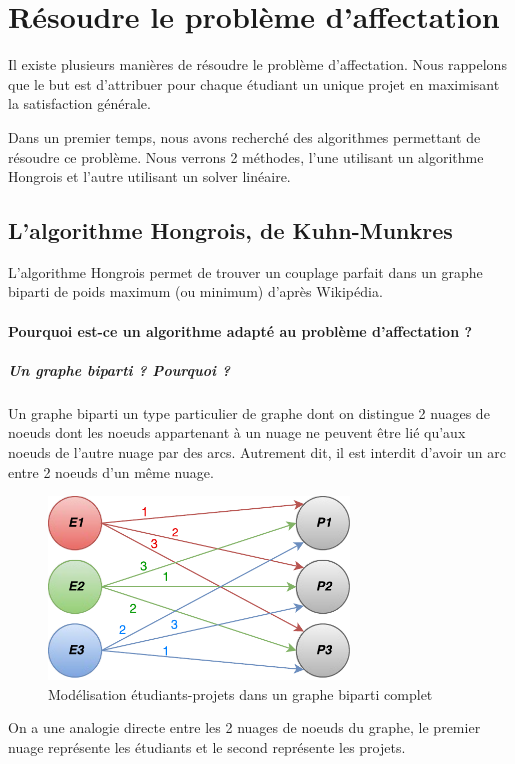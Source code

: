 \documentclass{polytech/polytech}
\begin{document}
\section{Résoudre le problème d'affectation}
Il existe plusieurs manières de résoudre le problème d'affectation.
Nous rappelons que le but est d'attribuer pour chaque étudiant un unique projet en maximisant la satisfaction générale.

Dans un premier temps, nous avons recherché des algorithmes permettant de résoudre ce problème. Nous verrons 2 méthodes, l'une utilisant un algorithme Hongrois et l'autre utilisant un solver linéaire.

\subsection{L'algorithme Hongrois, de Kuhn-Munkres}

L'algorithme Hongrois permet de trouver un couplage parfait dans un graphe biparti de poids maximum (ou minimum) d'après Wikipédia.

\paragraph{Pourquoi est-ce un algorithme adapté au problème d'affectation ?}

\subparagraph{Un graphe biparti ? Pourquoi ?}
Un graphe biparti un type particulier de graphe dont on distingue 2 nuages de noeuds dont les noeuds appartenant à un nuage ne peuvent être lié qu'aux noeuds de l'autre nuage par des arcs. 
Autrement dit, il est interdit d'avoir un arc entre 2 noeuds d'un même nuage.

\begin{figure}[htbp]
\includegraphics[width=8cm]{images/Graphe_bipartie}
\caption{\label{fig:graphe_biparti}Modélisation étudiants-projets dans un graphe biparti complet}
\end{figure}

On a une analogie directe entre les 2 nuages de noeuds du graphe, le premier nuage représente les étudiants et le second représente les projets.
\end{document}
